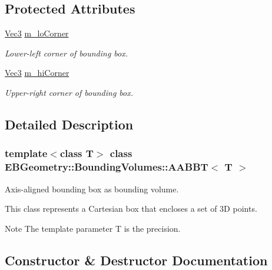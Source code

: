 \subsection*{Protected Attributes}
\begin{DoxyCompactItemize}
\item 
\mbox{\label{classEBGeometry_1_1BoundingVolumes_1_1AABBT_a96be6d9fbb8f50ed4a28983882e8adbf}} 
\hyperlink{classEBGeometry_1_1BoundingVolumes_1_1AABBT_af139f618de2c5138990a63e93eb7d066}{Vec3} \hyperlink{classEBGeometry_1_1BoundingVolumes_1_1AABBT_a96be6d9fbb8f50ed4a28983882e8adbf}{m\+\_\+lo\+Corner}
\begin{DoxyCompactList}\small\item\em Lower-\/left corner of bounding box. \end{DoxyCompactList}\item 
\mbox{\label{classEBGeometry_1_1BoundingVolumes_1_1AABBT_a68a9efa49a6930d325195e2309459f8b}} 
\hyperlink{classEBGeometry_1_1BoundingVolumes_1_1AABBT_af139f618de2c5138990a63e93eb7d066}{Vec3} \hyperlink{classEBGeometry_1_1BoundingVolumes_1_1AABBT_a68a9efa49a6930d325195e2309459f8b}{m\+\_\+hi\+Corner}
\begin{DoxyCompactList}\small\item\em Upper-\/right corner of bounding box. \end{DoxyCompactList}\end{DoxyCompactItemize}


\subsection{Detailed Description}
\subsubsection*{template$<$class T$>$\newline
class E\+B\+Geometry\+::\+Bounding\+Volumes\+::\+A\+A\+B\+B\+T$<$ T $>$}

Axis-\/aligned bounding box as bounding volume. 

This class represents a Cartesian box that encloses a set of 3D points. \begin{DoxyNote}{Note}
The template parameter T is the precision. 
\end{DoxyNote}


\subsection{Constructor \& Destructor Documentation}
\mbox{\label{classEBGeometry_1_1BoundingVolumes_1_1AABBT_a14344a09e9c31143fe819c768518d974}} 

